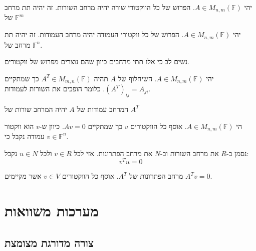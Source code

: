 \documentclass{tstextbook}
\begin{document}
\begin{definition}
יהי \(A \in M_{n,m}\left( \mathbb{F}  \right)\). הפרוש של כל הווקטורי שורה יהיה מרחב השורות. זה יהיה תת מרחב של \(\mathbb{F} ^{m}\)

\end{definition}
\begin{definition}
יהי \(A \in M_{n,m}\left( \mathbb{F}  \right)\). הפרוש של כל ווקטורי העמודה יהיה מרחב העמודות. זה יהיה תת מרחב של \(\mathbb{F} ^{n}\).

\end{definition}
\begin{remark}
נשים לב כי אלו תתי מרחבים כיוון שהם נוצרים מפרוש של ווקטורים. 

\end{remark}
\begin{definition}
יהי \(A \in M_{n,m}\left( \mathbb{F}  \right)\). השיחלוף של \(A\) תהיה \(A^{T}\in M_{m,n}\left( \mathbb{F}  \right)\) כך שמתקיים \((A^{T})_{ij}=A_{ji}\). כלומר הופכים את השורות לעמודות.

\end{definition}
\begin{proposition}
המרחב עמודות של \(A\) יהיה המרחב שורות של \(A^{T}\)

\end{proposition}
\begin{definition}
הי \(A \in M_{n,m}\left( \mathbb{F}  \right)\). אוסף כל הווקטורים \(v\) כך שמתקיים \(Av=0\). כיוון ש-\(v\) הוא ווקטור עמודה נקבל כי \(v\in \mathbb{F} ^{n}\).

\end{definition}
\begin{proposition}
נסמן ב-\(R\) את מרחב השורות וב-\(N\) את מרחב הפתרונות. אזי לכל \(v \in R\) ולכל \(u \in N\) נקבל:
$$v^{T}u=0$$

\end{proposition}
\begin{definition}
מרחב הפתרונות של \(A^{T}\). אוסף כל הווקטורים \(v \in V\) אשר מקיימים \(A^{T}v=0\).

\end{definition}
\chapter{מערכות משוואות}

\section{צורה מדורגת מצומצת}
\end{document}
